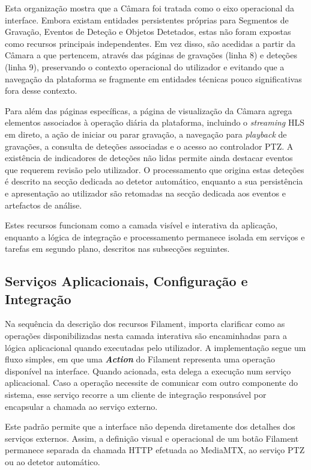 Esta organização mostra que a Câmara foi tratada como o eixo operacional da interface. Embora existam entidades persistentes próprias para Segmentos de Gravação, Eventos de Deteção e Objetos Detetados, estas não foram expostas como recursos principais independentes. Em vez disso, são acedidas a partir da Câmara a que pertencem, através das páginas de gravações (linha 8) e deteções (linha 9), preservando o contexto operacional do utilizador e evitando que a navegação da plataforma se fragmente em entidades técnicas pouco significativas fora desse contexto.

Para além das páginas específicas, a página de visualização da Câmara agrega elementos associados à operação diária da plataforma, incluindo o \textit{streaming} \gls{HLS} em direto, a ação de iniciar ou parar gravação, a navegação para \textit{playback} de gravações, a consulta de deteções associadas e o acesso ao controlador \gls{PTZ}. A existência de indicadores de deteções não lidas permite ainda destacar eventos que requerem revisão pelo utilizador. O processamento que origina estas deteções é descrito na secção dedicada ao detetor automático, enquanto a sua persistência e apresentação ao utilizador são retomadas na secção dedicada aos eventos e artefactos de análise.

Estes recursos funcionam como a camada visível e interativa da aplicação, enquanto a lógica de integração e processamento permanece isolada em serviços e tarefas em segundo plano, descritos nas subsecções seguintes.

\subsection{Serviços Aplicacionais, Configuração e Integração}

Na sequência da descrição dos recursos Filament, importa clarificar como as operações disponibilizadas nesta camada interativa são encaminhadas para a lógica aplicacional quando executadas pelo utilizador. A implementação segue um fluxo simples, em que uma \textit{\textbf{Action}} do Filament representa uma operação disponível na interface. Quando acionada, esta delega a execução num serviço aplicacional. Caso a operação necessite de comunicar com outro componente do sistema, esse serviço recorre a um cliente de integração responsável por encapsular a chamada ao serviço externo.

Este padrão permite que a interface não dependa diretamente dos detalhes dos serviços externos. Assim, a definição visual e operacional de um botão Filament permanece separada da chamada HTTP efetuada ao MediaMTX, ao serviço PTZ ou ao detetor automático.

